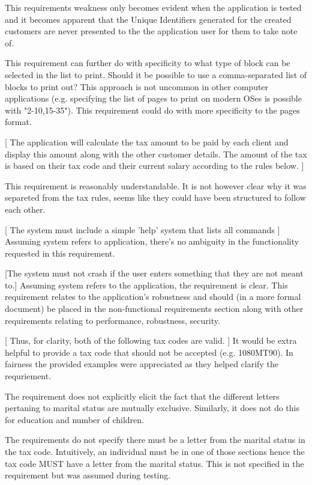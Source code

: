 This requirements weakness only becomes evident when the application is tested and it becomes apparent that the Unique Identifiers generated for the created customers are never presented to the the application user for them to take note of. 

This requirement can further do with specificity to what type of block can be selected in the list to print. 
Should it be possible to use a comma-separated list of blocks to print out? This approach is not uncommon in other computer applications (e.g. specifying the list of pages to print on modern OSes is possible with "2-10,15-35"). This requirement could do with more specificity to the pages format. 

[ The application will calculate the tax amount to be paid by each client and display this amount along with the other customer details. The amount of the tax is based on their tax
code and their current salary according to the rules below. ]

This requirement is reasonably understandable. It is not however clear why it was separeted from the tax rules, seems like they could have been structured to follow each other. 

[ The system must include a simple 'help' system that lists all commands ]
Assuming system refers to application, there's no ambiguity in the functionality requested in this requirement. 

[The system must not crash if the user enters something that they are not meant to.]
Assuming system refers to the application, the requirement is clear. This requirement relates to the application's robustness and should (in a more formal document) be placed in the non-functional requirements section along with other requirements relating to performance, robustness, security. 

[ Thus, for clarity, both of the following tax codes are valid. ] 
It would be extra helpful to provide a tax code that should not be accepted (e.g. 1080MT90). In fairness the provided examples were appreciated as they helped clarify the requriement.

The requirement does not explicitly elicit the fact that the different letters pertaning to marital status are mutually exclusive. Similarly, it does not do this for education and number of children. 

The requirements do not specify there must be a letter from the marital status in the tax code. Intuitively, an individual must be in one of those sections hence the tax code MUST have a letter from the marital status. This is not specified in the requirement but was assumed during testing. 

